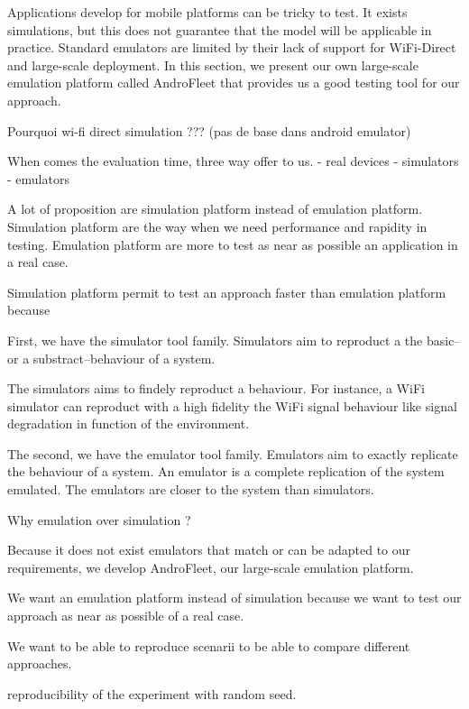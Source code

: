 Applications develop for mobile platforms can be tricky to test.
It exists simulations, but this does not guarantee that the model will be applicable in practice.
Standard emulators are limited by their lack of support for WiFi-Direct and large-scale deployment.
In this section, we present our own large-scale emulation platform called AndroFleet that provides us a good testing tool for our approach.

Pourquoi wi-fi direct simulation ??? (pas de base dans android emulator)


When comes the evaluation time, three way offer to us.
- real devices
- simulators
- emulators

A lot of proposition are simulation platform instead of emulation platform.
Simulation platform are the way when we need performance and rapidity in testing.
Emulation platform are more to test as near as possible an application in a real case.


Simulation platform permit to test an approach faster than emulation platform because 

First, we have the simulator tool family.
Simulators aim to reproduct a the basic--or a substract--behaviour of a system.

The simulators aims to findely reproduct a behaviour.
For instance, a WiFi simulator can reproduct with a high fidelity the WiFi signal behaviour like signal degradation in function of the environment.

The second, we have the emulator tool family.
Emulators aim to exactly replicate the behaviour of a system.
An emulator is a complete replication of the system emulated.
The emulators are closer to the system than simulators.

Why emulation over simulation ?

Because it does not exist emulators that match or can be adapted to our requirements, we develop AndroFleet, our large-scale emulation platform.

We want an emulation platform instead of simulation because we want to test our approach as near as possible of a real case.

We want to be able to reproduce scenarii to be able to compare different approaches.


reproducibility of the experiment with random seed.


